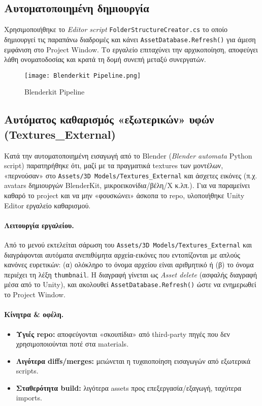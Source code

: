 \subsection*{Αυτοματοποιημένη δημιουργία}
Χρησιμοποιήθηκε το \textit{Editor script} \texttt{FolderStructureCreator.cs} το οποίο δημιουργεί τις παραπάνω διαδρομές και κάνει \texttt{AssetDatabase.Refresh()} για άμεση εμφάνιση στο Project Window. Το εργαλείο επιταχύνει την αρχικοποίηση, αποφεύγει λάθη ονοματοδοσίας και κρατά τη δομή συνεπή μεταξύ συνεργατών.

\begin{figure}[H]
    \centering
    \texttt{[image: Blenderkit Pipeline.png]}
    \caption{Blenderkit Pipeline}
    \label{fig:placeholder}
\end{figure}
\subsection*{Αυτόματος καθαρισμός «εξωτερικών» υφών (Textures\_External)}

Κατά την αυτοματοποιημένη εισαγωγή από το Blender (\emph{Blender automata} Python script) παρατηρήθηκε ότι, μαζί με τα πραγματικά textures των μοντέλων, «περνούσαν» στο \texttt{Assets/3D Models/Textures\_External} και άσχετες εικόνες (π.χ. avatars δημιουργών BlenderKit, μικροεικονίδια/βέλη/Χ κ.λπ.). Για να παραμείνει καθαρό το project και να μην «φουσκώνει» άσκοπα το repo, υλοποιήθηκε Unity Editor εργαλείο καθαρισμού.

\paragraph{Λειτουργία εργαλείου.}
Από το μενού  εκτελείται σάρωση του \texttt{Assets/3D Models/Textures\_External} και διαγράφονται αυτόματα ανεπιθύμητα αρχεία-εικόνες που εντοπίζονται με απλούς κανόνες ευρετικών: (α) ολόκληρο το όνομα αρχείου είναι αριθμητικό ή (β) το όνομα περιέχει τη λέξη \texttt{thumbnail}. Η διαγραφή γίνεται ως \emph{Asset delete} (ασφαλής διαγραφή μέσα από το Unity), και ακολουθεί \texttt{AssetDatabase.Refresh()} ώστε να ενημερωθεί το Project Window. 

\paragraph{Κίνητρα \& οφέλη.}
\begin{itemize}
  \item \textbf{Υγιές repo:} αποφεύγονται «σκουπίδια» από third-party πηγές που δεν χρησιμοποιούνται ποτέ στα materials.
  \item \textbf{Λιγότερα diffs/merges:} μειώνεται η τυχαιοποίηση εισαγωγών από εξωτερικά scripts.
  \item \textbf{Σταθερότητα build:} λιγότερα assets προς επεξεργασία/εξαγωγή, ταχύτερα imports.
\end{itemize}

